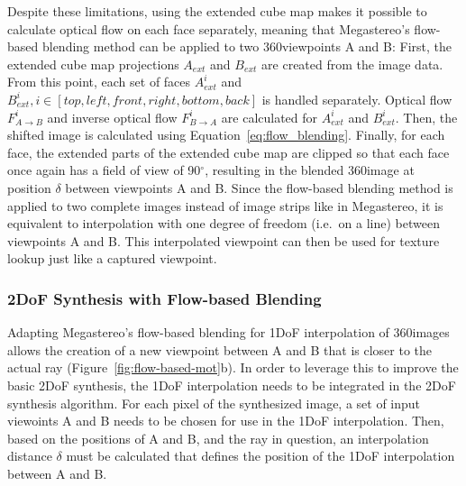 Despite these limitations, using the extended cube map makes it possible to calculate optical flow on each face separately, meaning that Megastereo's flow-based blending method can be applied to two 360\degree viewpoints A and B: First, the extended cube map projections $A_{ext}$ and $B_{ext}$ are created from the image data. From this point, each set of faces $A_{ext}^{i}$ and $B_{ext}^{i}, i \in [top, left, front, right, bottom, back]$ is handled separately. Optical flow $F_{A\to B}^i$ and inverse optical flow $F_{B\to A}^i$ are calculated for $A_{ext}^{i}$ and $B_{ext}^{i}$. Then, the shifted image is calculated using Equation~\ref{eq:flow_blending}. Finally, for each face, the extended parts of the extended cube map are clipped so that each face once again has a field of view of 90$^{\circ}$, resulting in the blended 360\degree image at position $\delta$ between viewpoints A and B. Since the flow-based blending method is applied to two complete images instead of image strips like in Megastereo, it is equivalent to interpolation with one degree of freedom (i.e.\ on a line) between viewpoints A and B. This interpolated viewpoint can then be used for texture lookup just like a captured viewpoint.

\subsubsection{2DoF Synthesis with Flow-based Blending} \label{subsec:2dof_flow-based}
Adapting Megastereo's flow-based blending for 1DoF interpolation of 360\degree images allows the creation of a new viewpoint between A and B that is closer to the actual ray (Figure~\ref{fig:flow-based-mot}b). In order to leverage this to improve the basic 2DoF synthesis, the 1DoF interpolation needs to be integrated in the 2DoF synthesis algorithm. For each pixel of the synthesized image, a set of input viewoints A and B needs to be chosen for use in the 1DoF interpolation. Then, based on the positions of A and B, and the ray in question, an interpolation distance $\delta$ must be calculated that defines the position of the 1DoF interpolation between A and B.

